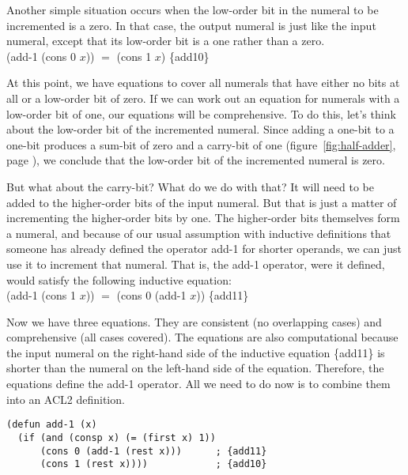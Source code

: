 Another simple situation occurs when the low-order bit in the
numeral to be incremented is a zero.
In that case, the output numeral is
just like the input numeral, except that its
low-order bit is a one rather than a zero.
\\
\vspace{2mm}
\hspace*{2cm}
\textsf{(add-1 (cons 0 $x$))} $=$ \textsf{(cons 1 $x$)}    \hfill \{add10\}

At this point, we have equations to cover all numerals
that have either no bits at all or a low-order bit
of zero. If we can work out an equation for numerals
with a low-order bit of one, our equations will be comprehensive.
To do this, let's think about the
low-order bit of the incremented numeral.
Since adding a one-bit to a one-bit produces a sum-bit
of zero and a carry-bit of one
(figure~\ref{fig:half-adder}, page \pageref{fig:half-adder}),
we conclude that the low-order bit of the incremented numeral
is zero.

But what about the carry-bit? What do we do with that?
It will need to be added to the higher-order bits of
the input numeral. But that is just a matter of incrementing
the higher-order bits by one.
The higher-order bits themselves form a numeral,
and because of our usual assumption with inductive definitions that
someone has already defined the operator
\textsf{add-1} for shorter operands,
we can just use it to increment that numeral.
That is, the \textsf{add-1} operator, were it defined,
would satisfy the following inductive equation:
\\
\vspace{2mm}
\hspace*{2cm}
\textsf{(add-1 (cons 1 $x$))} $=$ \textsf{(cons 0 (add-1 $x$))}   \hfill \{add11\}

Now we have three equations.
They are consistent (no overlapping cases) and
comprehensive (all cases covered).
The equations are also computational because the input numeral
on the right-hand side of the inductive equation
\{add11\} is shorter than
the numeral on the left-hand side of the equation.
Therefore, the equations define the \textsf{add-1} operator.
All we need to do now is to combine them into an ACL2 definition.

\label{add-1-defun}
\begin{code}
\begin{verbatim}
(defun add-1 (x)
  (if (and (consp x) (= (first x) 1))
      (cons 0 (add-1 (rest x)))      ; {add11}
      (cons 1 (rest x))))            ; {add10}
\end{verbatim}
\end{code}

